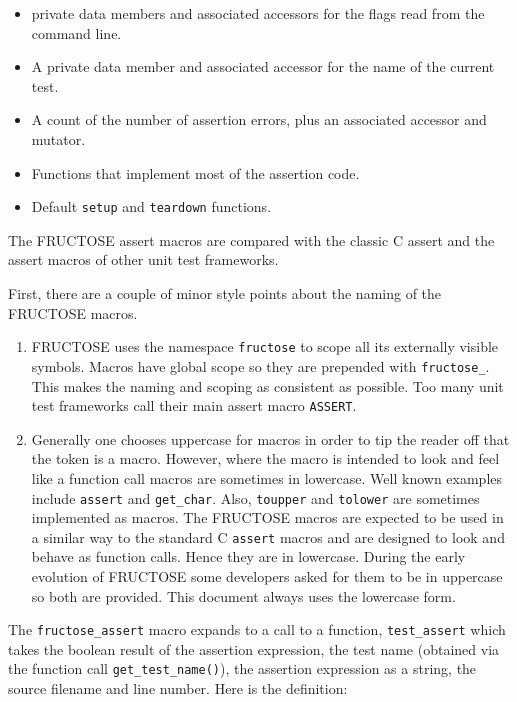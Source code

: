 \documentclass{book}
\begin{document}
\begin{itemize}
\item private data members and associated accessors
for the flags read from the command line.

\item A private data member and associated accessor
for the name of the current test.

\item A count of the number of assertion errors, plus
an associated accessor and mutator.

\item Functions that implement most of the assertion code.

\item Default {\tt setup} and {\tt teardown} functions.
\end{itemize}


The FRUCTOSE assert macros are compared with the classic C assert
and the assert macros of other unit test frameworks.

First, there are a couple of minor style points
about the naming of the FRUCTOSE macros.
\begin{enumerate}
\item FRUCTOSE uses the namespace {\tt fructose} to scope all its externally
visible symbols. Macros have global scope so they are prepended with
{\tt fructose\_}. This makes the naming and scoping as consistent as possible.
Too many unit test frameworks call their main assert macro {\tt ASSERT}.

\item Generally one chooses uppercase for macros in order to tip the reader
off that the token is a macro. However, where the macro is intended to look
and feel like a function call macros are sometimes in lowercase. 
Well known examples include {\tt assert} and {\tt get\_char}. 
Also, {\tt toupper} and {\tt tolower} are sometimes implemented as macros.
The FRUCTOSE macros are expected to be used in a similar way to the standard
C {\tt assert} macros and are designed to look and behave as function calls.
Hence they are in lowercase. During the early evolution of FRUCTOSE some
developers asked for them to be in uppercase so both are provided.
This document always uses the lowercase form.
\end{enumerate}

The {\tt fructose\_assert} macro expands to a call to a function,
{\tt test\_assert} which takes the boolean result of the assertion expression,
the test name (obtained via the function call {\tt get\_test\_name()}),
the assertion expression as a string, 
the source filename and line number.
Here is the definition:
\end{document}
